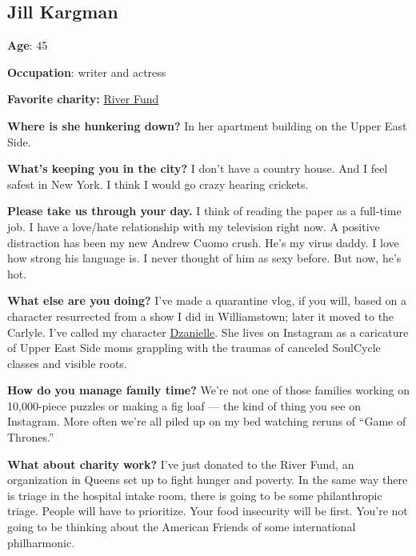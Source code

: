 \hypertarget{jill-kargman}{%
\subsection{Jill Kargman}\label{jill-kargman}}

\textbf{Age}: 45

\textbf{Occupation}: writer and actress

\textbf{Favorite charity:} \href{https://www.river.fund/}{River Fund}

\textbf{Where is she hunkering down?} In her apartment building on the
Upper East Side.

\textbf{What's keeping you in the city?} I don't have a country house.
And I feel safest in New York. I think I would go crazy hearing
crickets.

\textbf{Please take us through your day.} I think of reading the paper
as a full-time job. I have a love/hate relationship with my television
right now. A positive distraction has been my new Andrew Cuomo crush.
He's my virus daddy. I love how strong his language is. I never thought
of him as sexy before. But now, he's hot.

\textbf{What else are you doing?} I've made a quarantine vlog, if you
will, based on a character resurrected from a show I did in
Williamstown; later it moved to the Carlyle. I've called my character
\href{https://www.instagram.com/stories/highlights/17856598183860833/?hl=en}{Dzanielle}.
She lives on Instagram as a caricature of Upper East Side moms grappling
with the traumas of canceled SoulCycle classes and visible roots.

\textbf{How do you manage family time?} We're not one of those families
working on 10,000-piece puzzles or making a fig loaf --- the kind of
thing you see on Instagram. More often we're all piled up on my bed
watching reruns of ``Game of Thrones.''

\textbf{What about charity work?} I've just donated to the River Fund,
an organization in Queens set up to fight hunger and poverty. In the
same way there is triage in the hospital intake room, there is going to
be some philanthropic triage. People will have to prioritize. Your food
insecurity will be first. You're not going to be thinking about the
American Friends of some international philharmonic.

\href{https://www.nytimes3xbfgragh.onion/news-event/coronavirus?action=click\&pgtype=Article\&state=default\&region=MAIN_CONTENT_3\&context=storylines_faq}{}

